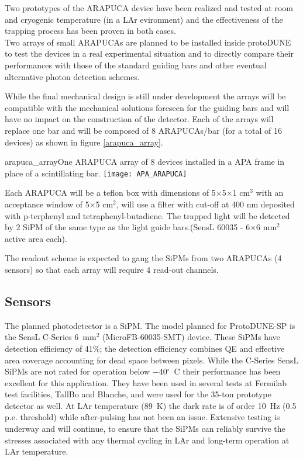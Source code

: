  Two prototypes of the ARAPUCA device have been realized and tested at room and cryogenic temperature (in a LAr evironment) and the effectiveness of the trapping process has been 
 proven in both cases.\\

Two arrays of small ARAPUCAs are planned to be installed inside protoDUNE to test the devices in a real experimental situation and to directly compare their performances with those of the standard guiding bars and other eventual alternative photon detection schemes.\

While the final mechanical design is still under development the arrays will be compatible with the mechanical solutions foreseen for the guiding bars and will have no impact on the construction of the detector. Each of the arrays will replace one bar and will be composed of 8 ARAPUCAs/bar (for a total of 16 devices)  as shown in figure \ref{arapuca_array}.
\begin{cdrfigure}{arapuca_array}{One ARAPUCA array of 8 devices installed in a APA frame in place of a scintillating bar.}
\texttt{[image: APA\_ARAPUCA]}
\end{cdrfigure}

Each ARAPUCA will be a teflon box with dimensions of 5$\times$5$\times$1 cm$^3$ with an acceptance window of 5$\times$5 
cm$^2$, will use a filter with cut-off at 400 nm deposited with p-terphenyl and tetraphenyl-butadiene. The trapped light will be detected by 2 SiPM of the same type as the light guide bars.(SensL 60035 - 6$\times$6 mm$^2$ 
active area each).

The readout scheme is expected to gang the SiPMs from two ARAPUCAs (4 sensors) so that each array will require 4 read-out channels. 


\subsection{Sensors}
The planned photodetector is a SiPM.  
The model planned for ProtoDUNE-SP is the SensL C-Series 6~mm$^2$
(MicroFB-60035-SMT) device. These SiPMs have detection efficiency of
41\%; the detection efficiency combines QE and effective area
  coverage accounting for dead space between pixels. While the
C-Series SensL SiPMs are not rated for operation below
$-$40$^{\circ}$~C their performance has been excellent for this
application. 
They have been used in several tests at Fermilab test facilities,
TallBo and Blanche, and were used for the 35-ton prototype detector
as well.  At LAr temperature (89~K) the dark rate is of order 10~Hz
(0.5 p.e. threshold) while after-pulsing has not been an
issue. Extensive testing is underway and will continue, to ensure 
that the SiPMs can reliably survive the stresses associated with 
any thermal cycling in LAr and long-term operation at LAr temperature.

